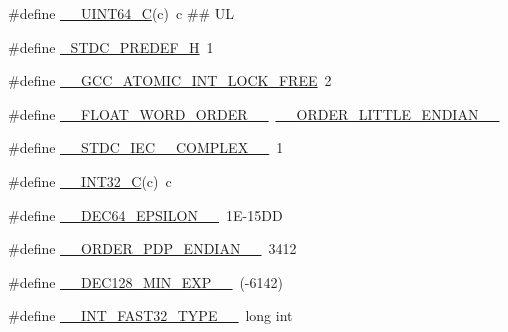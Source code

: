 \begin{DoxyCompactItemize}
\#define \hyperlink{build-analizer__host-_desktop___qt__5__9__0___g_c_c__64bit-debug_2moc__predefs_8h_a405cee4934ed56c9a4aa4e7dc4380bd2}{\+\_\+\+\_\+\+U\+I\+N\+T64\+\_\+\+C}(c)~c \#\# U\+L
\item 
\#define \hyperlink{build-analizer__host-_desktop___qt__5__9__0___g_c_c__64bit-debug_2moc__predefs_8h_a198efb9bd9b8de1c44f470b6c6ddf69d}{\+\_\+\+S\+T\+D\+C\+\_\+\+P\+R\+E\+D\+E\+F\+\_\+\+H}~1
\item 
\#define \hyperlink{build-analizer__host-_desktop___qt__5__9__0___g_c_c__64bit-debug_2moc__predefs_8h_ab6ba7de2838beb20b1eaca71c062c8e2}{\+\_\+\+\_\+\+G\+C\+C\+\_\+\+A\+T\+O\+M\+I\+C\+\_\+\+I\+N\+T\+\_\+\+L\+O\+C\+K\+\_\+\+F\+R\+E\+E}~2
\item 
\#define \hyperlink{build-analizer__host-_desktop___qt__5__9__0___g_c_c__64bit-debug_2moc__predefs_8h_a2db444477ad8f9aa0759310d46694339}{\+\_\+\+\_\+\+F\+L\+O\+A\+T\+\_\+\+W\+O\+R\+D\+\_\+\+O\+R\+D\+E\+R\+\_\+\+\_\+}~\hyperlink{build-analizer__host-_desktop___qt__5__9__0___g_c_c__64bit-_release_2moc__predefs_8h_a2b695357ce4b46971d54e8e9dfe5724f}{\+\_\+\+\_\+\+O\+R\+D\+E\+R\+\_\+\+L\+I\+T\+T\+L\+E\+\_\+\+E\+N\+D\+I\+A\+N\+\_\+\+\_\+}
\item 
\#define \hyperlink{build-analizer__host-_desktop___qt__5__9__0___g_c_c__64bit-debug_2moc__predefs_8h_a7b5b9dc07de6dd5c39c59b0ac260f943}{\+\_\+\+\_\+\+S\+T\+D\+C\+\_\+\+I\+E\+C\+\_\+\_\+\+C\+O\+M\+P\+L\+E\+X\+\_\+\+\_\+}~1
\item 
\#define \hyperlink{build-analizer__host-_desktop___qt__5__9__0___g_c_c__64bit-debug_2moc__predefs_8h_a3ef70e13cfbe3264fe0b212f8f46d76c}{\+\_\+\+\_\+\+I\+N\+T32\+\_\+\+C}(c)~c
\item 
\#define \hyperlink{build-analizer__host-_desktop___qt__5__9__0___g_c_c__64bit-debug_2moc__predefs_8h_a189bb13aac101f45c8ac7f6e52daccfa}{\+\_\+\+\_\+\+D\+E\+C64\+\_\+\+E\+P\+S\+I\+L\+O\+N\+\_\+\+\_\+}~1\+E-\/15\+D\+D
\item 
\#define \hyperlink{build-analizer__host-_desktop___qt__5__9__0___g_c_c__64bit-debug_2moc__predefs_8h_a94ead674b2441dc29dbd5d6aba467197}{\+\_\+\+\_\+\+O\+R\+D\+E\+R\+\_\+\+P\+D\+P\+\_\+\+E\+N\+D\+I\+A\+N\+\_\+\+\_\+}~3412
\item 
\#define \hyperlink{build-analizer__host-_desktop___qt__5__9__0___g_c_c__64bit-debug_2moc__predefs_8h_a748143fe17201c420b868b8f30c57d59}{\+\_\+\+\_\+\+D\+E\+C128\+\_\+\+M\+I\+N\+\_\+\+E\+X\+P\+\_\+\+\_\+}~(-\/6142)
\item 
\#define \hyperlink{build-analizer__host-_desktop___qt__5__9__0___g_c_c__64bit-debug_2moc__predefs_8h_a4e1f76417ed810f038c277a5aba691fa}{\+\_\+\+\_\+\+I\+N\+T\+\_\+\+F\+A\+S\+T32\+\_\+\+T\+Y\+P\+E\+\_\+\+\_\+}~long int

\end{DoxyCompactItemize}

